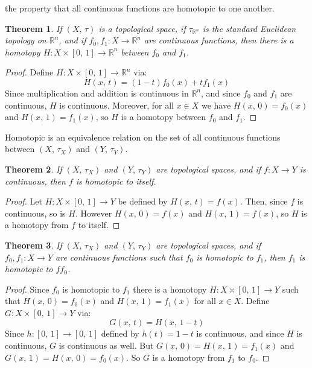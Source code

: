 \documentclass{article}
\theoremstyle{plain}
\newtheorem{theorem}{Theorem}[section]
\theoremstyle{normal}
\begin{document}
        the property that all continuous functions are homotopic to one another.
        \begin{theorem}
            If $(X,\,\tau)$ is a topological space, if $\tau_{\mathbb{R}^{n}}$
            is the standard Euclidean topology on $\mathbb{R}^{n}$, and if
            $f_{0},f_{1}:X\rightarrow\mathbb{R}^{n}$ are continuous functions,
            then there is a homotopy $H:X\times[0,\,1]\rightarrow\mathbb{R}^{n}$
            between $f_{0}$ and $f_{1}$.
        \end{theorem}
        \begin{proof}
            Define $H:X\times[0,\,1]\rightarrow\mathbb{R}^{n}$ via:
            \begin{equation}
                H(x,\,t)=(1-t)f_{0}(x)+tf_{1}(x)
            \end{equation}
            Since multiplication and addition is continuous in $\mathbb{R}^{n}$,
            and since $f_{0}$ and $f_{1}$ are continuous, $H$ is continuous.
            Moreover, for all $x\in{X}$ we have $H(x,\,0)=f_{0}(x)$ and
            $H(x,\,1)=f_{1}(x)$, so $H$ is a homotopy between $f_{0}$ and
            $f_{1}$.
        \end{proof}
        Homotopic is an equivalence relation on the set of all continuous
        functions between $(X,\,\tau_{X})$ and $(Y,\,\tau_{Y})$.
        \begin{theorem}
            If $(X,\,\tau_{X})$ and $(Y,\,\tau_{Y})$ are topological spaces,
            and if $f:X\rightarrow{Y}$ is continuous, then $f$ is homotopic to
            itself.
        \end{theorem}
        \begin{proof}
            Let $H:X\times[0,\,1]\rightarrow{Y}$ be defined by
            $H(x,\,t)=f(x)$. Then, since $f$ is continuous, so is $H$. However
            $H(x,\,0)=f(x)$ and $H(x,\,1)=f(x)$, so $H$ is a homotopy from $f$
            to itself.
        \end{proof}
        \begin{theorem}
            If $(X,\,\tau_{X})$ and $(Y,\,\tau_{Y})$ are topological spaces,
            and if $f_{0},f_{1}:X\rightarrow{Y}$ are continuous functions such
            that $f_{0}$ is homotopic to $f_{1}$, then $f_{1}$ is homotopic to
            $ff_{0}$.
        \end{theorem}
        \begin{proof}
            Since $f_{0}$ is homotopic to $f_{1}$ there is a homotopy
            $H:X\times[0,\,1]\rightarrow{Y}$ such that $H(x,\,0)=f_{0}(x)$ and
            $H(x,\,1)=f_{1}(x)$ for all $x\in{X}$. Define
            $G:X\times[0,\,1]\rightarrow{Y}$ via:
            \begin{equation}
                G(x,\,t)=H(x,\,1-t)
            \end{equation}
            Since $h:[0,\,1]\rightarrow[0,\,1]$ defined by $h(t)=1-t$ is
            continuous, and since $H$ is continuous, $G$ is continuous as well.
            But $G(x,\,0)=H(x,\,1)=f_{1}(x)$ and $G(x,\,1)=H(x,\,0)=f_{0}(x)$.
            So $G$ is a homotopy from $f_{1}$ to $f_{0}$.
        \end{proof}
\end{document}
